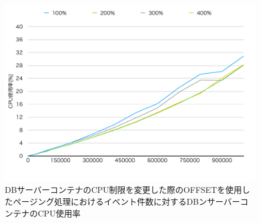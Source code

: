 \documentclass[../../../../../main]{subfiles}
\begin{document}
    \begin{figure}[H]
        \centering
        \includegraphics[width=12cm]{graph}
        \caption{DBサーバーコンテナのCPU制限を変更した際のOFFSETを使用したページング処理におけるイベント件数に対するDBンサーバーコンテナのCPU使用率}
        \label{fig:paging-offset-change-db-cpu-limit-db-cpu-app_4_8192-db_1024}
    \end{figure}
\end{document}

